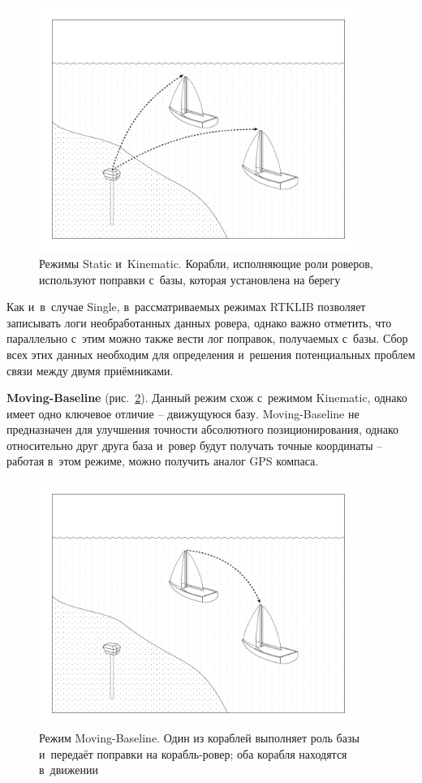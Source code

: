 \begin{dashitemize}
  \begin{figure}[h!]
    \centering
    \setlength{\fboxsep}{5pt}
    \includegraphics[height=8cm]{img/tikz/rtk-static-kinematic/pic}
    \caption{Режимы Static и~Kinematic. Корабли, исполняющие роли роверов, используют поправки с~базы, которая установлена на берегу}\label{fig:rtk-static-kinematic}
  \end{figure}
  
  Как и~в~случае Single, в~рассматриваемых режимах RTKLIB позволяет записывать логи необработанных данных ровера, однако важно отметить, что параллельно с~этим можно также вести лог поправок, получаемых с~базы. Сбор всех этих данных необходим для определения и~решения потенциальных проблем связи между двумя приёмниками.
  
  \item \textbf{Moving-Baseline} (рис.~\ref{fig:rtk-moving-baseline}). Данный режим схож с~режимом Kinematic, однако имеет одно ключевое отличие -- движущуюся базу. Moving-Baseline не предназначен для улучшения точности абсолютного позиционирования, однако относительно друг друга база и~ровер будут получать точные координаты -- работая в~этом режиме, можно получить аналог GPS компаса.
  
  \begin{figure}[h!]
    \centering
    \setlength{\fboxsep}{5pt}
    \includegraphics[height=8cm]{img/tikz/rtk-moving-baseline/pic}
    \caption{Режим Moving-Baseline. Один из кораблей выполняет роль базы и~передаёт поправки на корабль-ровер; оба корабля находятся в~движении}\label{fig:rtk-moving-baseline}
  \end{figure}
  

\end{dashitemize}
